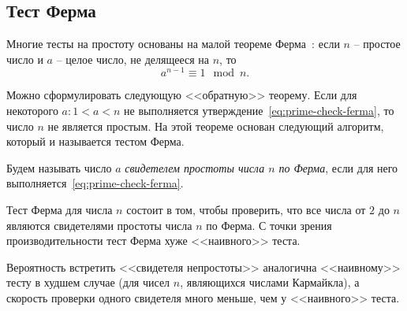 \subsection{Тест Ферма}\label{section-prime-check-ferma}

Многие тесты на простоту основаны на малой теореме Ферма~\cite{Vinberg:2008}: если $n$ -- простое число и $a$ -- целое число, не делящееся на $n$, то
\begin{equation}\label{eq:prime-check-ferma}
    a^{n-1} \equiv 1 \mod n.
\end{equation}

Можно сформулировать следующую <<обратную>> теорему. Если для некоторого $a: 1 < a < n$ не выполняется утверждение~\ref{eq:prime-check-ferma}, то число $n$ не является простым. На этой теореме основан следующий алгоритм, который и называется тестом Ферма.

Будем называть число $a$ \emph{свидетелем простоты числа $n$ по Ферма}, если для него выполняется~\ref{eq:prime-check-ferma}.

Тест Ферма для числа $n$ состоит в том, чтобы проверить, что все числа от $2$ до $n$ являются свидетелями простоты числа $n$ по Ферма. С точки зрения производительности тест Ферма хуже <<наивного>> теста.

Вероятность встретить <<свидетеля непростоты>> аналогична <<наивному>> тесту в худшем случае (для чисел $n$, являющихся числами Кармайкла), а скорость проверки одного свидетеля много меньше, чем у <<наивного>> теста.
